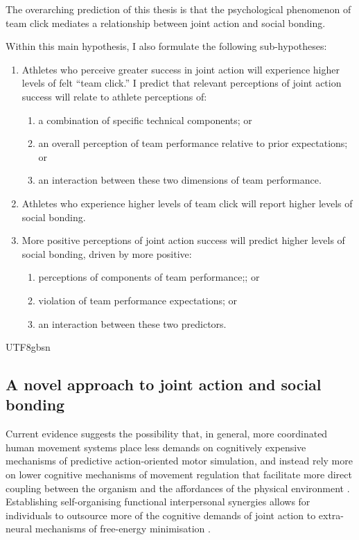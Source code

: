 \begin{CJK}{UTF8}{gbsn}
    The overarching prediction of this thesis is that the psychological phenomenon of team click mediates a relationship between joint action and social bonding.

    Within this main hypothesis, I also formulate the following sub-hypotheses:
    \begin{enumerate}
      \item Athletes who perceive greater success in joint action will experience higher levels of felt ``team click.'' I predict that relevant perceptions of joint action success will relate to athlete perceptions of:
        \begin{enumerate}
          \item a combination of specific technical components; or
          \item an overall perception of team performance relative to prior expectations; or
          \item an interaction between these two dimensions of team performance.
        \end{enumerate}
      \item Athletes who experience higher levels of team click will report higher levels of social bonding.
      \item More positive perceptions of joint action success will predict higher levels of social bonding, driven by more positive:
      \begin{enumerate}
        \item perceptions of components of team performance;; or
        \item violation of team performance expectations; or
        \item an interaction between these two predictors.
      \end{enumerate}
    \end{enumerate}








                                          \end{CJK}{UTF8}{gbsn}



\subsection{A novel approach to joint action and social bonding}

Current evidence suggests the possibility that, in general, more coordinated human movement systems place less demands on cognitively expensive mechanisms of predictive action-oriented motor simulation, and instead rely more on lower cognitive mechanisms of movement regulation that facilitate more direct coupling between the organism and the affordances of the physical environment \citep{Bourbousson2011,RKiouak2016}.  Establishing self-organising functional interpersonal synergies allows for individuals to outsource more of the cognitive demands of joint action to extra-neural mechanisms of free-energy minimisation \citep{Clark2013}.

